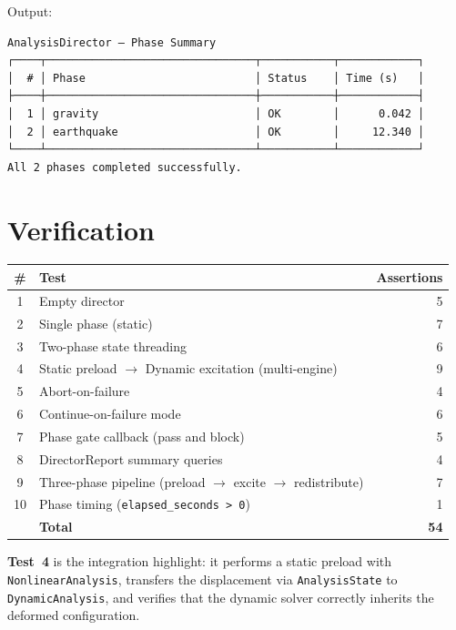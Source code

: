 Output:
\begin{verbatim}
AnalysisDirector — Phase Summary
┌────┬────────────────────────────────┬───────────┬────────────┐
│  # │ Phase                          │ Status    │ Time (s)   │
├────┼────────────────────────────────┼───────────┼────────────┤
│  1 │ gravity                        │ OK        │      0.042 │
│  2 │ earthquake                     │ OK        │     12.340 │
└────┴────────────────────────────────┴───────────┴────────────┘
All 2 phases completed successfully.
\end{verbatim}


\section{Verification}

\begin{center}
\begin{tabular}{clr}
\hline
\textbf{\#} & \textbf{Test} & \textbf{Assertions} \\
\hline
1  & Empty director                                        & 5  \\
2  & Single phase (static)                                 & 7  \\
3  & Two-phase state threading                             & 6  \\
4  & Static preload $\to$ Dynamic excitation (multi-engine)& 9  \\
5  & Abort-on-failure                                      & 4  \\
6  & Continue-on-failure mode                              & 6  \\
7  & Phase gate callback (pass and block)                  & 5  \\
8  & DirectorReport summary queries                        & 4  \\
9  & Three-phase pipeline (preload $\to$ excite $\to$ redistribute) & 7  \\
10 & Phase timing (\texttt{elapsed\_seconds > 0})          & 1  \\
\hline
   & \textbf{Total}                                        & \textbf{54} \\
\hline
\end{tabular}
\end{center}

\textbf{Test~4} is the integration highlight: it performs a static
preload with \texttt{NonlinearAnalysis}, transfers the displacement
via \texttt{AnalysisState} to \texttt{DynamicAnalysis}, and verifies
that the dynamic solver correctly inherits the deformed configuration.

